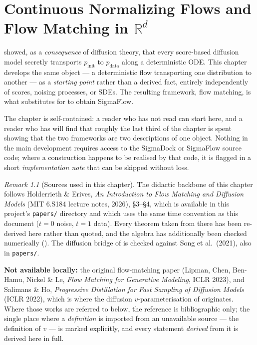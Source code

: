 \documentclass[11pt,a4paper]{report}
\theoremstyle{definition}
\theoremstyle{remark}
\newtheorem{remark}[remark]{Remark}
\newcommand{\RR}{\mathbb R}
\newcommand{\file}[1]{\texttt{#1}}
\begin{document}
\chapter{Continuous Normalizing Flows and Flow Matching in $\RR^d$}
\label{chap:flow-matching}

 showed, as a \emph{consequence} of diffusion
theory, that every score-based diffusion model secretly transports
$p_{\mathrm{init}}$ to $p_{\mathrm{data}}$ along a deterministic ODE. This
chapter develops the same object --- a deterministic flow transporting one
distribution to another --- as a \emph{starting point} rather than a
derived fact, entirely independently of scores, noising processes, or
SDEs. The resulting framework, flow matching, is what 
substitutes for  to obtain
SigmaFlow.

The chapter is self-contained: a reader who has not read
 can start here, and a reader who has will find
that roughly the last third of the chapter is spent showing that the two
frameworks are two descriptions of one object. Nothing in the main
development requires access to the SigmaDock or SigmaFlow source code;
where a construction happens to be realised by that code, it is flagged in
a short \emph{implementation note} that can be skipped without loss.

\begin{remark}[Sources used in this chapter]
\label{rem:fm-sources}
The didactic backbone of this chapter follows Holderrieth \& Erives,
\emph{An Introduction to Flow Matching and Diffusion Models} (MIT 6.S184
lecture notes, 2026), \S3--\S4, which is available in this project's
\file{papers/} directory and which uses the same time convention as this
document ($t=0$ noise, $t=1$ data). Every theorem taken from there has
been re-derived here rather than quoted, and the algebra has additionally
been checked numerically (). The diffusion bridge of
 is checked against Song et al.\ (2021), also
in \file{papers/}.

\textbf{Not available locally:} the original flow-matching paper (Lipman,
Chen, Ben-Hamu, Nickel \& Le, \emph{Flow Matching for Generative
Modeling}, ICLR 2023), and Salimans \& Ho, \emph{Progressive Distillation
for Fast Sampling of Diffusion Models} (ICLR 2022), which is where the
diffusion $v$-parameterisation of  originates.
Where those works are referred to below, the reference is bibliographic
only; the single place where a \emph{definition} is imported from an
unavailable source --- the definition of $v$ --- is marked explicitly, and
every statement \emph{derived} from it is derived here in full.
\end{remark}
\end{document}
